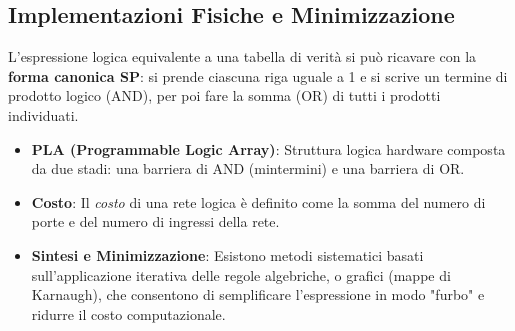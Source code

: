 \documentclass[12pt, a4paper]{article}
\begin{document}
\subsection{Implementazioni Fisiche e Minimizzazione}
L'espressione logica equivalente a una tabella di verità si può ricavare con la \textbf{forma canonica SP}: si prende ciascuna riga uguale a 1 e si scrive un termine di prodotto logico (AND), per poi fare la somma (OR) di tutti i prodotti individuati.
\begin{itemize}
    \item \textbf{PLA (Programmable Logic Array)}: Struttura logica hardware composta da due stadi: una barriera di AND (mintermini) e una barriera di OR.
    \item \textbf{Costo}: Il \textit{costo} di una rete logica è definito come la somma del numero di porte e del numero di ingressi della rete.
    \item \textbf{Sintesi e Minimizzazione}: Esistono metodi sistematici basati sull'applicazione iterativa delle regole algebriche, o grafici (mappe di Karnaugh), che consentono di semplificare l'espressione in modo "furbo" e ridurre il costo computazionale.
\end{itemize}
\end{document}
